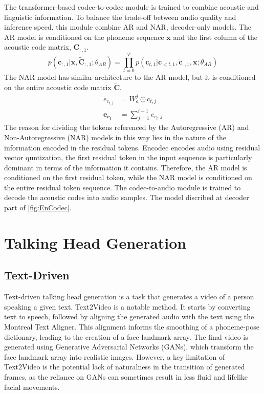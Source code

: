 The transformer-based codec-to-codec module is trained to combine acoustic and linguistic information.
To balance the trade-off between audio quality and inference speed, this module combine AR and NAR, decoder-only models.
The AR model is conditioned on the phoneme sequence $\mathbf{x}$ and the first column of the acoustic code matrix, $\mathbf{{C}}_{:,1}$. 
\begin{equation}
\label{AR}
    p (\mathbf{c}_{:,1} | \mathbf{x}, \mathbf{\tilde{C}}_{:,1}; \theta_{AR}) = \prod_{t=0}^{T} p(\mathbf{c}_{t, 1}|\mathbf{ c}_{<t, 1}, \mathbf{\tilde{c}}_{:,1}, \mathbf{x}; \theta_{AR})
\end{equation} 
The NAR model has similar architecture to the AR model, but it is conditioned on the entire acoustic code matrix $\mathbf{\tilde{C}}$.
\begin{align}
    e_{c_{t,j}} &= W_a^j \odot {c_{t,j}} \\
    \mathbf{e_{c_t}} &= \sum_{j=1}^{i-1} e_{c_t,j}
\end{align}
The reason for dividing the tokens referenced by the Autoregressive (AR) and Non-Autoregressive (NAR) models in this way lies in the nature of the information encoded in the residual tokens. Encodec \cite{EnCodec} encodes audio using residual vector quntization, the first residual token in the input sequence is particularly dominant in terms of the information it contains. Therefore, the AR model is conditioned on the first residual token, while the NAR model is conditioned on the entire residual token sequence.
The codec-to-audio module is trained to decode the acoustic codes into audio samples. The model discribed at decoder part of \ref{fig:EnCodec}.

\section{Talking Head Generation}
\label{sec:talking_head_generation}

\subsection{Text-Driven}
\label{subsec:text_driven}
Text-driven talking head generation is a task that generates a video of a person speaking a given text.
Text2Video\cite{Text2Video} is a notable method. It starts by converting text to speech, followed by aligning the generated audio with the text using the Montreal Text Aligner.
This alignment informs the smoothing of a phoneme-pose dictionary, leading to the creation of a face landmark array. The final video is generated using Generative Adversarial Networks (GANs), which transform the face landmark array into realistic images.
However, a key limitation of Text2Video is the potential lack of naturalness in the transition of generated frames, as the reliance on GANs can sometimes result in less fluid and lifelike facial movements.


